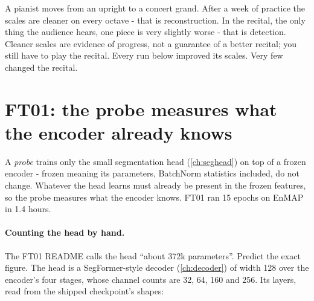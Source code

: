 \begin{analogy}
A pianist moves from an upright to a concert grand. After a week of practice the scales are cleaner on every
octave - that is reconstruction. In the recital, the only thing the audience hears, one piece is very slightly
worse - that is detection. Cleaner scales are evidence of progress, not a guarantee of a better recital; you still
have to play the recital. Every run below improved its scales. Very few changed the recital.
\end{analogy}

\section{FT01: the probe measures what the encoder already knows}\label{sec:ftruns:ft01}

A \emph{probe} trains only the small segmentation head (\cref{ch:seghead}) on top of a frozen encoder - frozen
meaning its parameters, BatchNorm statistics included, do not change. Whatever the head learns must already be
present in the frozen features, so the probe measures what the encoder knows. FT01 ran 15 epochs on EnMAP in
1.4 hours.

\paragraph{Counting the head by hand.} The FT01 README calls the head ``about 372k parameters''. Predict the
exact figure. The head is a SegFormer-style decoder (\cref{ch:decoder}) of width 128 over the encoder's four
stages, whose channel counts are 32, 64, 160 and 256. Its layers, read from the shipped checkpoint's shapes:

